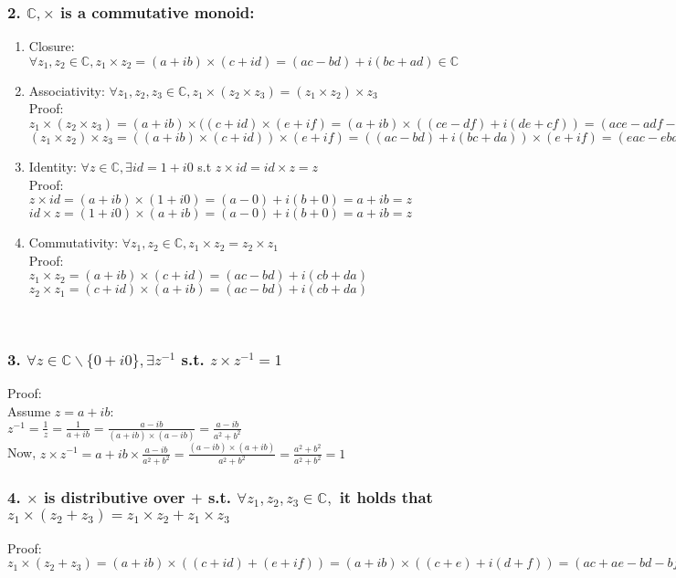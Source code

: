 \documentclass[11pt]{article}
\begin{document}
\subsubsection*{\textbf{2. }$\mathbb{C}, \times$ is a commutative monoid:}
\begin{enumerate}
    \item Closure: $\forall z_1,z_2 \in \mathbb{C}, z_1\times z_2 =(a+ib)\times (c+id) = (ac-bd)+i(bc+ad) \in \mathbb{C}$
    \item Associativity: $\forall z_1,z_2,z_3 \in \mathbb{C},z_1\times (z_2\times z_3)=(z_1\times z_2)\times z_3$\\
    Proof:\\
    $z_1\times(z_2\times z_3)=(a+ib)\times((c+id)\times(e+if)=(a+ib)\times((ce-df)+i(de+cf))=(ace-adf-bde-bcf)+i(bce-dfb+ade+acf)$\\
    $(z_1\times z_2)\times z_3=((a+ib)\times(c+id))\times(e+if)=((ac-bd)+i(bc+da))\times(e+if)=(eac-ebd-fbc-fda)+i(bce+dae+fac-fbd)$
    \item Identity: $\forall z \in \mathbb{C}, \exists id=1+i0$ s.t $z\times id=id\times z=z$\\
    Proof:\\
    $z\times id=(a+ib)\times (1+i0)=(a-0)+i(b+0)=a+ib=z$\\
    $id\times z=(1+i0)\times (a+ib)=(a-0)+i(b+0)=a+ib=z$
    \item Commutativity: $\forall z_1,z_2 \in \mathbb{C}, z_1\times z_2=z_2\times z_1$\\
    Proof:\\
    $z_1\times z_2=(a+ib)\times(c+id)=(ac-bd)+i(cb+da)$\\
    $z_2\times z_1=(c+id)\times(a+ib)=(ac-bd)+i(cb+da)$
\end{enumerate}
​
\subsubsection*{\textbf{3. }$\forall z \in \mathbb{C}\backslash\{0+i0\}, \exists z^{-1}$ s.t. $z\times z^{-1}=1$}
Proof:\\
Assume $z=a+ib:$\\
$z^{-1}=\frac{1}{z}=\frac{1}{a+ib}=\frac{a-ib}{(a+ib)\times(a-ib)}=\frac{a-ib}{a^2+b^2}$\\
Now, $z\times z^{-1}=a+ib \times \frac{a-ib}{a^2+b^2} =\frac{(a-ib)\times (a+ib)}{a^2+b^2}=\frac{a^2+b^2}{a^2+b^2}=1$
​
\subsubsection*{\textbf{4. }$\times$ is distributive over $+$ s.t. $\forall z_1,z_2,z_3 \in \mathbb{C},$ it holds that $z_1\times(z_2+z_3)=z_1\times z_2 + z_1 \times z_3$}
Proof:\\
$z_1\times(z_2+z_3)=(a+ib)\times((c+id)+(e+if))=(a+ib)\times((c+e)+i(d+f))=(ac+ae-bd-bf)+i(bc+be+ad+af)=(ac-bd)+i(bc+ad)+(ae-bf)+i(be+fa)=(a+ib)\times(c+id)+(a+ib)\times(e+if)=z_1\times z_2 + z_1 \times z_3$
\end{document}
